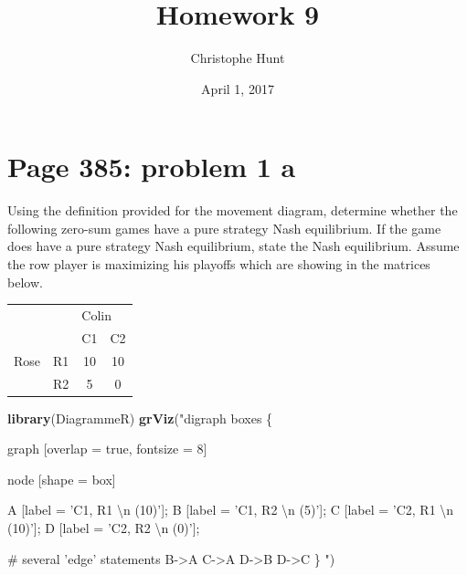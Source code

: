 \documentclass[]{article}
\title{Homework 9}
\author{Christophe Hunt}
\date{April 1, 2017}
\newenvironment{Shaded}{\begin{snugshade}}{\end{snugshade}}
\newcommand{\KeywordTok}[1]{\textcolor[rgb]{0.13,0.29,0.53}{\textbf{{#1}}}}
\newcommand{\CharTok}[1]{\textcolor[rgb]{0.31,0.60,0.02}{{#1}}}
\newcommand{\StringTok}[1]{\textcolor[rgb]{0.31,0.60,0.02}{{#1}}}
\newcommand{\NormalTok}[1]{{#1}}
\begin{document}
\maketitle

{
\setcounter{tocdepth}{2}
\tableofcontents
}
\newpage

\section{Page 385: problem 1 a}\label{page-385-problem-1-a}

Using the definition provided for the movement diagram, determine
whether the following zero-sum games have a pure strategy Nash
equilibrium. If the game does have a pure strategy Nash equilibrium,
state the Nash equilibrium. Assume the row player is maximizing his
playoffs which are showing in the matrices below.

\begin{table}[!h]
\centering
\begin{tabular}{lllc}
 &  & \multicolumn{2}{l}{Colin} \\ \cline{3-4}
 &  & C1 & \multicolumn{1}{l}{C2} \\ \hline
Rose & R1 & \multicolumn{1}{c}{10} & 10 \\
 & R2 & \multicolumn{1}{c}{5} & 0 \\ \hline
\end{tabular}
\end{table}

\begin{Shaded}
\begin{Highlighting}[]
\KeywordTok{library}\NormalTok{(DiagrammeR)}
\KeywordTok{grViz}\NormalTok{(}\StringTok{"digraph boxes \{}

\StringTok{  graph [overlap = true, fontsize = 8]}

\StringTok{  node [shape = box]}

\StringTok{  A [label = 'C1, R1 }\CharTok{\textbackslash{}n}\StringTok{ (10)']; }
\StringTok{  B [label = 'C1, R2 }\CharTok{\textbackslash{}n}\StringTok{ (5)']; }
\StringTok{  C [label = 'C2, R1 }\CharTok{\textbackslash{}n}\StringTok{ (10)']; }
\StringTok{  D [label = 'C2, R2 }\CharTok{\textbackslash{}n}\StringTok{ (0)']; }

\StringTok{  # several 'edge' statements}
\StringTok{  B->A C->A D->B D->C}
\StringTok{\}}
\StringTok{"}\NormalTok{)}
\end{Highlighting}
\end{Shaded}
\end{document}
